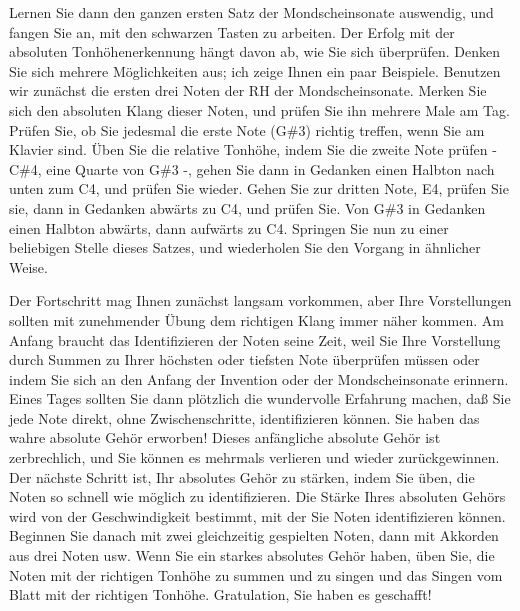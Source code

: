 Lernen Sie dann den ganzen ersten Satz der Mondscheinsonate auswendig, und fangen Sie an, mit den schwarzen Tasten zu arbeiten.
Der Erfolg mit der absoluten Tonhöhenerkennung hängt davon ab, wie Sie sich überprüfen.
Denken Sie sich mehrere Möglichkeiten aus; ich zeige Ihnen ein paar Beispiele.
Benutzen wir zunächst die ersten drei Noten der RH der Mondscheinsonate.
Merken Sie sich den absoluten Klang dieser Noten, und prüfen Sie ihn mehrere Male am Tag.
Prüfen Sie, ob Sie jedesmal die erste Note (G\#3) richtig treffen, wenn Sie am Klavier sind.
Üben Sie die relative Tonhöhe, indem Sie die zweite Note prüfen - C\#4, eine Quarte von G\#3 -, gehen Sie dann in Gedanken einen Halbton nach unten zum C4, und prüfen Sie wieder.
Gehen Sie zur dritten Note, E4, prüfen Sie sie, dann in Gedanken abwärts zu C4, und prüfen Sie.
Von G\#3 in Gedanken einen Halbton abwärts, dann aufwärts zu C4.
Springen Sie nun zu einer beliebigen Stelle dieses Satzes, und wiederholen Sie den Vorgang in ähnlicher Weise.

Der Fortschritt mag Ihnen zunächst langsam vorkommen, aber Ihre Vorstellungen sollten mit zunehmender Übung dem richtigen Klang immer näher kommen.
Am Anfang braucht das Identifizieren der Noten seine Zeit, weil Sie Ihre Vorstellung durch Summen zu Ihrer höchsten oder tiefsten Note überprüfen müssen oder indem Sie sich an den Anfang der Invention oder der Mondscheinsonate erinnern.
Eines Tages sollten Sie dann plötzlich die wundervolle Erfahrung machen, daß Sie jede Note direkt, ohne Zwischenschritte,  identifizieren können.
Sie haben das wahre absolute Gehör erworben!
Dieses anfängliche absolute Gehör ist zerbrechlich, und Sie können es mehrmals verlieren und wieder zurückgewinnen.
Der nächste Schritt ist, Ihr absolutes Gehör zu stärken, indem Sie üben, die Noten so schnell wie möglich zu identifizieren.
Die Stärke Ihres absoluten Gehörs wird von der Geschwindigkeit bestimmt, mit der Sie Noten identifizieren können.
Beginnen Sie danach mit zwei gleichzeitig gespielten Noten, dann mit Akkorden aus drei Noten usw.
Wenn Sie ein starkes absolutes Gehör haben, üben Sie, die Noten mit der richtigen Tonhöhe zu summen und zu singen und das Singen vom Blatt mit der richtigen Tonhöhe.
Gratulation, Sie haben es geschafft!

